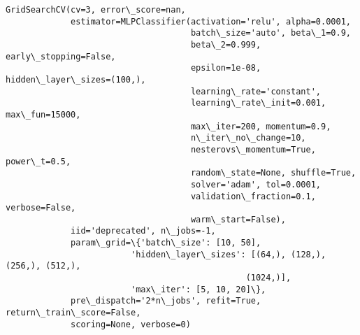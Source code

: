 \documentclass[11pt]{article}
\makeatletter
\newcommand{\boxspacing}{\kern\kvtcb@left@rule\kern\kvtcb@boxsep}
\newcommand{\prompt}[4]{
        \ttfamily\llap{{\color{#2}[#3]:\hspace{3pt}#4}}\vspace{-\baselineskip}
    }
\makeatother
\begin{document}
            \begin{tcolorbox}[breakable, size=fbox, boxrule=.5pt, pad at break*=1mm, opacityfill=0]
\prompt{Out}{outcolor}{ }{\boxspacing}
\begin{Verbatim}[commandchars=\\\{\}]
GridSearchCV(cv=3, error\_score=nan,
             estimator=MLPClassifier(activation='relu', alpha=0.0001,
                                     batch\_size='auto', beta\_1=0.9,
                                     beta\_2=0.999, early\_stopping=False,
                                     epsilon=1e-08, hidden\_layer\_sizes=(100,),
                                     learning\_rate='constant',
                                     learning\_rate\_init=0.001, max\_fun=15000,
                                     max\_iter=200, momentum=0.9,
                                     n\_iter\_no\_change=10,
                                     nesterovs\_momentum=True, power\_t=0.5,
                                     random\_state=None, shuffle=True,
                                     solver='adam', tol=0.0001,
                                     validation\_fraction=0.1, verbose=False,
                                     warm\_start=False),
             iid='deprecated', n\_jobs=-1,
             param\_grid=\{'batch\_size': [10, 50],
                         'hidden\_layer\_sizes': [(64,), (128,), (256,), (512,),
                                                (1024,)],
                         'max\_iter': [5, 10, 20]\},
             pre\_dispatch='2*n\_jobs', refit=True, return\_train\_score=False,
             scoring=None, verbose=0)
\end{Verbatim}
\end{tcolorbox}
        
\end{document}
